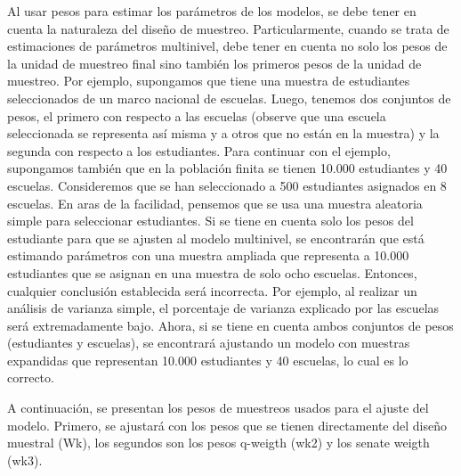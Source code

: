 \documentclass[
  12pt,
]{book}
\newenvironment{Shaded}{\begin{snugshade}}{\end{snugshade}}
\newcommand{\AttributeTok}[1]{\textcolor[rgb]{0.13,0.29,0.53}{#1}}
\newcommand{\FunctionTok}[1]{\textcolor[rgb]{0.13,0.29,0.53}{\textbf{#1}}}
\newcommand{\NormalTok}[1]{#1}
\newcommand{\OtherTok}[1]{\textcolor[rgb]{0.56,0.35,0.01}{#1}}
\newcommand{\SpecialCharTok}[1]{\textcolor[rgb]{0.81,0.36,0.00}{\textbf{#1}}}
\begin{document}
Al usar pesos para estimar los parámetros de los modelos, se debe tener en cuenta la naturaleza del diseño de muestreo. Particularmente, cuando se trata de estimaciones de parámetros multinivel, debe tener en cuenta no solo los pesos de la unidad de muestreo final sino también los primeros pesos de la unidad de muestreo. Por ejemplo, supongamos que tiene una muestra de estudiantes seleccionados de un marco nacional de escuelas. Luego, tenemos dos conjuntos de pesos, el primero con respecto a las escuelas (observe que una escuela seleccionada se representa así misma y a otros que no están en la muestra) y la segunda con respecto a los estudiantes. Para continuar con el ejemplo, supongamos también que en la población finita se tienen 10.000 estudiantes y 40 escuelas. Consideremos que se han seleccionado a 500 estudiantes asignados en 8 escuelas. En aras de la facilidad, pensemos que se usa una muestra aleatoria simple para seleccionar estudiantes. Si se tiene en cuenta solo los pesos del estudiante para que se ajusten al modelo multinivel, se encontrarán que está estimando parámetros con una muestra ampliada que representa a 10.000 estudiantes que se asignan en una muestra de solo ocho escuelas. Entonces, cualquier conclusión establecida será incorrecta. Por ejemplo, al realizar un análisis de varianza simple, el porcentaje de varianza explicado por las escuelas será extremadamente bajo. Ahora, si se tiene en cuenta ambos conjuntos de pesos (estudiantes y escuelas), se encontrará ajustando un modelo con muestras expandidas que representan 10.000 estudiantes y 40 escuelas, lo cual es lo correcto.

A continuación, se presentan los pesos de muestreos usados para el ajuste del modelo. Primero, se ajustará con los pesos que se tienen directamente del diseño muestral (Wk), los segundos son los pesos q-weigth (wk2) y los senate weigth (wk3).

\begin{Shaded}
\end{Shaded}
\end{document}
